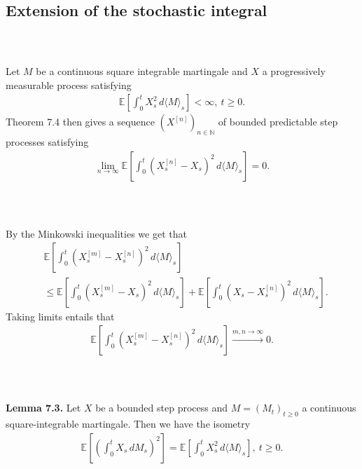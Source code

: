 \documentclass{beamer}
\numberwithin{equation}{section}
\newenvironment{frame2}{\begin{frame}\frametitle{{\normalsize \secname} \\ {\large \subsecname}}}{\end{frame}}
\begin{document}
\subsection{Extension of the stochastic integral}

\begin{frame2}
    Let $M$ be a continuous square integrable martingale and $X$ a progressively measurable process satisfying
    \begin{align*}
        \mathbb{E}\left[\int_0^t X_s^2 \, d \langle M \rangle_s \right] < \infty, \ t \geq 0.
    \end{align*}
    Theorem 7.4 then gives a sequence $(X^{[n]})_{n\in \mathbb{N}}$ of bounded predictable step processes satisfying
    \begin{align*}
        \lim_{n \to \infty} \mathbb{E}\left[\int_0^t (X_s^{[n]} - X_s)^2 \, d\langle M \rangle_s\right] = 0.
    \end{align*}
\end{frame2}

\begin{frame2}
    By the Minkowski inequalities we get that
    \begin{align*}
        &\mathbb{E}\left[\int_0^t (X_s^{[m]} - X^{[n]}_s)^2 \, d\langle M \rangle_s\right] \\
        &\leq \mathbb{E}\left[\int_0^t (X_s^{[m]} - X_s)^2 \, d\langle M \rangle_s\right]  + \mathbb{E}\left[\int_0^t (X_s - X_s^{[n]})^2 \, d\langle M \rangle_s\right].
    \end{align*}
    Taking limits entails that
    \begin{align}
        \mathbb{E}\left[\int_0^t (X_s^{[m]} - X^{[n]}_s)^2 \, d\langle M \rangle_s\right] \xrightarrow{m,n\to \infty} 0.
    \end{align}
\end{frame2}

\begin{frame2}
    \textbf{Lemma 7.3.}
    Let $X$ be a bounded step process and $M = (M_t)_{t \geq 0}$ a continuous square-integrable martingale.
    Then we have the isometry
    \begin{align}
        \mathbb{E}\left[\left(\int_0^t X_s \, d M_s\right)^2\right] = \mathbb{E}\left[\int_0^t X_s^2 \, d\langle M \rangle_s\right], \ t \geq 0.
    \end{align}
\end{frame2}
\end{document}

